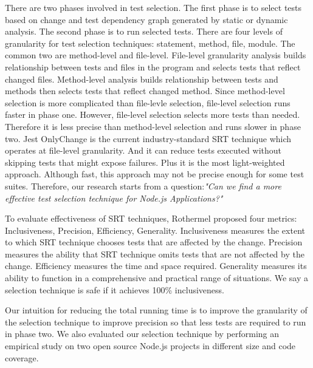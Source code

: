 \documentclass[10pt, conference]{IEEEtran}
\begin{document}
There are two phases involved in test selection. The first phase is to select tests based on change and 
test dependency graph generated by static or dynamic analysis. The second phase is to run selected tests.
There are four levels of granularity for test selection techniques: statement, method, file, module. The common 
two are method-level and file-level. File-level granularity analysis builds relationship between tests and files in 
the program and selects tests that reflect changed files. Method-level analysis builds relationship between tests and methods 
then selects tests that reflect changed method. Since method-level selection is more complicated than  
file-levle selection, file-level selection runs faster in phase one. However, file-level selection selects more 
tests than needed. Therefore it is less precise than method-level selection and runs slower in phase two. 
Jest OnlyChange is the current industry-standard SRT technique which operates at file-level granularity. And it can reduce tests executed 
without skipping tests that might expose failures. Plus it is the most light-weighted approach. Although fast, this approach may not be precise 
enough for some test suites. Therefore, our research starts from a question:\textit{"Can we find a more 
effective test selection technique for Node.js Applications?"} 

To evaluate effectiveness of SRT techniques, Rothermel\cite{b13} proposed four metrics: Inclusiveness, Precision, Efficiency, Generality. Inclusiveness 
measures the extent to which SRT technique chooses tests that are affected by the change. Precision measures 
the ability that SRT technique omits tests that are not affected by the change. Efficiency measures the time and 
space required. Generality measures its ability to function in a comprehensive and practical range of situations.
We say a selection technique is safe if it achieves 100\% inclusiveness.

Our intuition for reducing the total running time is to 
improve the granularity of the selection technique to improve precision so that less tests are required to run in phase two. 
We also evaluated our selection technique by performing an empirical study on two open source Node.js projects in different 
size and code coverage.
\end{document}
